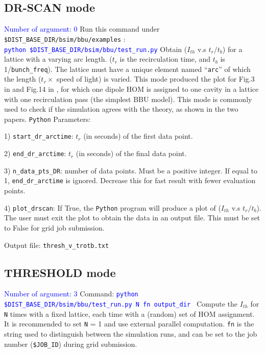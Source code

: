 \documentclass{hitec}
\begin{document}
\subsection{DR-SCAN mode}
\textcolor{blue}{Number of argument: 0}
\bigbreak
Run this command under \texttt{ \$DIST_BASE_DIR/bsim/bbu/examples} :
\\
\textcolor{blue}{\texttt{python   \$DIST_BASE_DIR/bsim/bbu/test_run.py}} 
\bigbreak
Obtain ($I_{th}$ v.s $t_r/t_b$) for a lattice with a varying arc length. ($t_r$ is the recirculation time, and $t_b$ is 1/\texttt{bunch_freq}). The lattice must have a unique element named ``\texttt{arc}'' of which the length ($t_r \times$ speed of light) is varied.
This mode produced the plot for Fig.3 in \cite{GeorgBBU} and Fig.14 in \cite{WlouBBU}, for which one dipole HOM is assigned to one cavity in a lattice with one recirculation pass (the simplest BBU model). This mode is commonly used to check if the simulation agrees with the theory, as shown in the two papers.
\bigbreak
\texttt{Python} Parameters:

1) \texttt{start_dr_arctime}: $t_r$ (in seconds) of the first data point.

2) \texttt{end_dr_arctime}: $t_r$ (in seconds) of the final data point.

3) \texttt{n_data_pts_DR}: number of data points. Must be a positive integer. If equal to 1, \texttt{end_dr_arctime} is ignored. Decrease this for fast result with fewer evaluation points.

4) \texttt{plot_drscan}: If True, the \texttt{Python} program will produce a plot of ($I_{th}$ v.s $t_r/t_b$). The user must exit the plot to obtain the data in an output file. This must be set to False for grid job submission.  

\bigbreak
Output file: \texttt{thresh_v_trotb.txt}

\subsection{THRESHOLD mode}      
\textcolor{blue}{Number of argument: 3}
\bigbreak
Command: \textcolor{blue}{\texttt{python \$DIST_BASE_DIR/bsim/bbu/test_run.py  \text{} N \text{} fn \text{} output_dir }}
\bigbreak
Compute the $I_{th}$ for \texttt{N} times with a fixed lattice, each time with a (random) set of HOM assignment. It is recommended to set \texttt{N} = 1 and use external parallel computation. \texttt{fn} is the string used to distinguish between the simulation runs, and can be set to the job number (\texttt{\$JOB_ID}) during grid submission.
\end{document}
